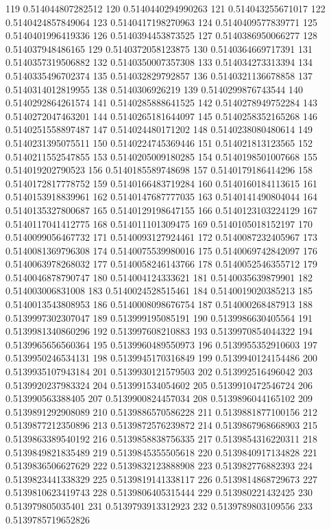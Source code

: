 119 0.514044807282512
120 0.5140440294990263
121 0.514043255671017
122 0.5140424857849064
123 0.5140417198270963
124 0.5140409577839771
125 0.5140401996419336
126 0.5140394453873525
127 0.5140386950066277
128 0.514037948486165
129 0.5140372058123875
130 0.5140364669717391
131 0.5140357319506882
132 0.5140350007357308
133 0.514034273313394
134 0.5140335496702374
135 0.514032829792857
136 0.5140321136678858
137 0.5140314012819955
138 0.5140306926219
139 0.5140299876743544
140 0.5140292864261574
141 0.5140285888641525
142 0.5140278949752284
143 0.5140272047463201
144 0.5140265181644097
145 0.5140258352165268
146 0.5140251558897487
147 0.514024480171202
148 0.5140238080480614
149 0.5140231395075511
150 0.5140224745369446
151 0.514021813123565
152 0.5140211552547855
153 0.5140205009180285
154 0.5140198501007668
155 0.514019202790523
156 0.5140185589748698
157 0.5140179186414296
158 0.5140172817778752
159 0.5140166483719284
160 0.5140160184113615
161 0.5140153918839961
162 0.5140147687777035
163 0.5140141490804044
164 0.5140135327800687
165 0.5140129198647155
166 0.5140123103224129
167 0.5140117041412775
168 0.514011101309475
169 0.5140105018152197
170 0.5140099056467732
171 0.5140093127924461
172 0.5140087232405967
173 0.5140081369796308
174 0.5140075539980016
175 0.5140069742842097
176 0.5140063978268032
177 0.5140058246143766
178 0.5140052546355712
179 0.5140046878790747
180 0.514004124333621
181 0.5140035639879901
182 0.514003006831008
183 0.5140024528515461
184 0.5140019020385213
185 0.5140013543808953
186 0.5140008098676754
187 0.514000268487913
188 0.5139997302307047
189 0.513999195085191
190 0.5139986630405564
191 0.5139981340860296
192 0.513997608210883
193 0.5139970854044322
194 0.5139965656560364
195 0.5139960489550973
196 0.5139955352910603
197 0.5139950246534131
198 0.5139945170316849
199 0.5139940124154486
200 0.5139935107943184
201 0.5139930121579503
202 0.513992516496042
203 0.5139920237983324
204 0.513991534054602
205 0.5139910472546724
206 0.513990563388405
207 0.5139900824457034
208 0.5139896044165102
209 0.5139891292908089
210 0.5139886570586228
211 0.5139881877100156
212 0.5139877212350896
213 0.5139872576239872
214 0.5139867968668903
215 0.5139863389540192
216 0.5139858838756335
217 0.5139854316220311
218 0.5139849821835489
219 0.5139845355505618
220 0.5139840917134828
221 0.5139836506627629
222 0.5139832123888908
223 0.513982776882393
224 0.5139823441338329
225 0.5139819141338117
226 0.5139814868729673
227 0.5139810623419743
228 0.5139806405315444
229 0.513980221432425
230 0.513979805035401
231 0.5139793913312923
232 0.5139789803109556
233 0.5139785719652826
